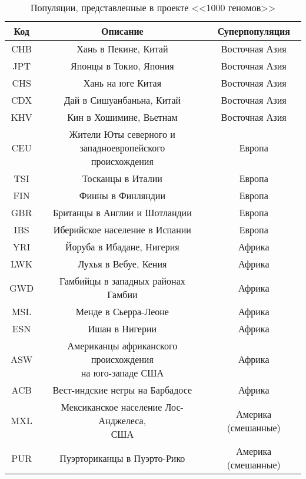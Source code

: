 \begin{table} [htbp]
	\centering
	\begin{threeparttable}
		\caption{Популяции, представленные в проекте <<1000 геномов>>}%
		\label{tab:populations}%
		\begin{SingleSpace}
			\begin{tabular}{| c | c | c |}
				\hline
				Код 	& Описание 							& Суперпопуляция \\ \hline
				CHB 	& Хань в Пекине, Китай 				& Восточная Азия \\ \hline
				JPT 	& Японцы в Токио, Япония 			& Восточная Азия \\ \hline
				CHS 	& Хань на юге Китая 				& Восточная Азия \\ \hline
				CDX 	& Дай в Сишуанбаньна, Китай 		& Восточная Азия \\ \hline
				KHV 	& Кин в Хошимине, Вьетнам			& Восточная Азия \\ \hline
				CEU 	& \thead{Жители Юты северного и западноевропейского \\ происхождения} 		& Европа \\ \hline
				TSI 	& Тосканцы в Италии	 				& Европа \\ \hline
				FIN 	& Финны в Финляндии 				& Европа \\ \hline
				GBR 	& Британцы в Англии и Шотландии		& Европа \\ \hline
				IBS 	& Иберийское население в Испании	& Европа \\ \hline
				YRI 	& Йоруба в Ибадане, Нигерия			& Африка \\ \hline
				LWK 	& Лухья в Вебуе, Кения		 		& Африка \\ \hline
				GWD 	& Гамбийцы в западных районах Гамбии										& Африка \\ \hline
				MSL 	& Менде в Сьерра-Леоне				& Африка \\ \hline
				ESN 	& Ишан в Нигерии	 				& Африка \\ \hline
				ASW 	& \thead{Американцы африканского происхождения \\ на юго-западе США}		& Африка \\ \hline
				ACB 	& Вест-индские негры на Барбадосе 	& Африка \\ \hline
				MXL 	& \thead{Мексиканское население Лос-Анджелеса, \\ США} 						& Америка (смешанные) \\ \hline
				PUR 	& Пуэрториканцы в Пуэрто-Рико		& Америка (смешанные) \\ \hline

\end{tabular}
\end{SingleSpace}
\end{threeparttable}
\end{table}
